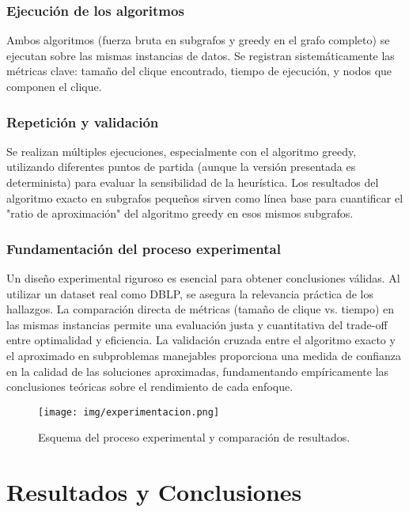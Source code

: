 \documentclass[12pt,a4paper]{report}
\begin{document}
\subsection{Ejecución de los algoritmos}
Ambos algoritmos (fuerza bruta en subgrafos y greedy en el grafo completo) se ejecutan sobre las mismas instancias de datos. Se registran sistemáticamente las métricas clave: tamaño del clique encontrado, tiempo de ejecución, y nodos que componen el clique.

\subsection{Repetición y validación}
Se realizan múltiples ejecuciones, especialmente con el algoritmo greedy, utilizando diferentes puntos de partida (aunque la versión presentada es determinista) para evaluar la sensibilidad de la heurística. Los resultados del algoritmo exacto en subgrafos pequeños sirven como línea base para cuantificar el "ratio de aproximación" del algoritmo greedy en esos mismos subgrafos.

\subsection{Fundamentación del proceso experimental}
Un diseño experimental riguroso es esencial para obtener conclusiones válidas. Al utilizar un dataset real como DBLP, se asegura la relevancia práctica de los hallazgos. La comparación directa de métricas (tamaño de clique vs. tiempo) en las mismas instancias permite una evaluación justa y cuantitativa del trade-off entre optimalidad y eficiencia. La validación cruzada entre el algoritmo exacto y el aproximado en subproblemas manejables proporciona una medida de confianza en la calidad de las soluciones aproximadas, fundamentando empíricamente las conclusiones teóricas sobre el rendimiento de cada enfoque.

\begin{figure}[H]
    \centering
    \texttt{[image: img/experimentacion.png]}
    \caption{Esquema del proceso experimental y comparación de resultados.}
    \label{fig:esquema_experimental}
\end{figure}

\newpage

\chapter{Resultados y Conclusiones}
\end{document}
